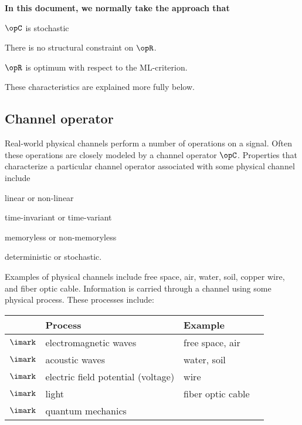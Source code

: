 {\bf In this document, we normally take the approach that}
\begin{enume}
   \item $\opC$ is stochastic
   \item There is no structural constraint on $\opR$.
   \item $\opR$ is optimum with respect to the ML-criterion.
\end{enume}
These characteristics are explained more fully below.

\subsection{Channel operator}
Real-world physical channels perform a number of operations on
a signal.
Often these operations are closely modeled by a channel
operator $\opC$.
Properties that characterize a particular
channel operator associated with some physical channel include
\begin{liste}
   \item linear or non-linear
   \item time-invariant or time-variant
   \item memoryless or non-memoryless
   \item deterministic or stochastic.
\end{liste}
Examples of physical channels include
free space, air, water, soil, copper wire, and fiber optic cable.
Information is carried through a channel using some physical process.
These processes include:

\begin{tabular}{cl|ll}
             & Process          & Example             \\
   \hline
   $\imark$ & electromagnetic waves & free space, air    &\\%
   $\imark$ & acoustic waves        & water, soil         \\
   $\imark$ & electric field potential (voltage)  & wire                \\
   $\imark$ & light            & fiber optic cable   \\
   $\imark$ & quantum mechanics         &
\end{tabular}


